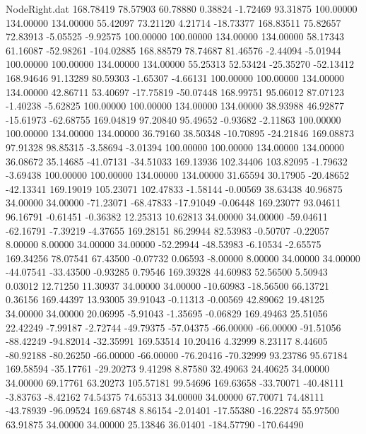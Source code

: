 \begin{filecontents}{NodeRight.dat}
 168.78419   78.57903   60.78880     0.38824   -1.72469   93.31875  100.00000  134.00000  134.00000   55.42097   73.21120    4.21714  -18.73377
 168.83511   75.82657   72.83913    -5.05525   -9.92575  100.00000  100.00000  134.00000  134.00000   58.17343   61.16087  -52.98261 -104.02885
 168.88579   78.74687   81.46576    -2.44094   -5.01944  100.00000  100.00000  134.00000  134.00000   55.25313   52.53424  -25.35270  -52.13412
 168.94646   91.13289   80.59303    -1.65307   -4.66131  100.00000  100.00000  134.00000  134.00000   42.86711   53.40697  -17.75819  -50.07448
 168.99751   95.06012   87.07123    -1.40238   -5.62825  100.00000  100.00000  134.00000  134.00000   38.93988   46.92877  -15.61973  -62.68755
 169.04819   97.20840   95.49652    -0.93682   -2.11863  100.00000  100.00000  134.00000  134.00000   36.79160   38.50348  -10.70895  -24.21846
 169.08873   97.91328   98.85315    -3.58694   -3.01394  100.00000  100.00000  134.00000  134.00000   36.08672   35.14685  -41.07131  -34.51033
 169.13936  102.34406  103.82095    -1.79632   -3.69438  100.00000  100.00000  134.00000  134.00000   31.65594   30.17905  -20.48652  -42.13341
 169.19019  105.23071  102.47833    -1.58144   -0.00569   38.63438   40.96875   34.00000   34.00000  -71.23071  -68.47833  -17.91049   -0.06448
 169.23077   93.04611   96.16791    -0.61451   -0.36382   12.25313   10.62813   34.00000   34.00000  -59.04611  -62.16791   -7.39219   -4.37655
 169.28151   86.29944   82.53983    -0.50707   -0.22057    8.00000    8.00000   34.00000   34.00000  -52.29944  -48.53983   -6.10534   -2.65575
 169.34256   78.07541   67.43500    -0.07732    0.06593   -8.00000    8.00000   34.00000   34.00000  -44.07541  -33.43500   -0.93285    0.79546
 169.39328   44.60983   52.56500     5.50943    0.03012   12.71250   11.30937   34.00000   34.00000  -10.60983  -18.56500   66.13721    0.36156
 169.44397   13.93005   39.91043    -0.11313   -0.00569   42.89062   19.48125   34.00000   34.00000   20.06995   -5.91043   -1.35695   -0.06829
 169.49463   25.51056   22.42249    -7.99187   -2.72744  -49.79375  -57.04375  -66.00000  -66.00000  -91.51056  -88.42249  -94.82014  -32.35991
 169.53514   10.20416    4.32999     8.23117    8.44605  -80.92188  -80.26250  -66.00000  -66.00000  -76.20416  -70.32999   93.23786   95.67184
 169.58594  -35.17761  -29.20273     9.41298    8.87580   32.49063   24.40625   34.00000   34.00000   69.17761   63.20273  105.57181   99.54696
 169.63658  -33.70071  -40.48111    -3.83763   -8.42162   74.54375   74.65313   34.00000   34.00000   67.70071   74.48111  -43.78939  -96.09524
 169.68748    8.86154   -2.01401   -17.55380  -16.22874   55.97500   63.91875   34.00000   34.00000   25.13846   36.01401 -184.57790 -170.64490

\end{filecontents}

